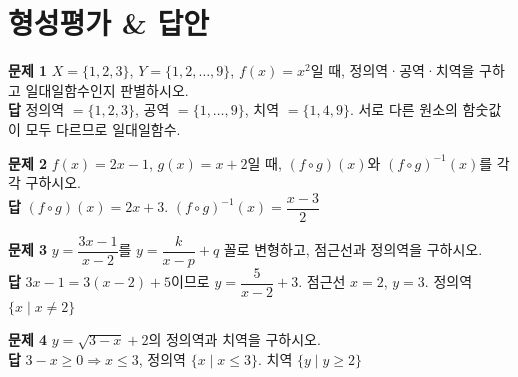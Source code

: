 \documentclass[11pt,a4paper]{article}
\begin{document}
\section{형성평가 \& 답안}
\begin{minipage}[t]{0.48\linewidth}
\begin{answerbox}
\textbf{문제 1} \quad $X=\{1,2,3\}$, $Y=\{1,2,\ldots,9\}$, $f(x)=x^2$일 때, 정의역·공역·치역을 구하고 일대일함수인지 판별하시오.\\[4pt]
\textbf{\color{goldstrong}답} \; 정의역 $=\{1,2,3\}$, 공역 $=\{1,\ldots,9\}$, 치역 $=\{1,4,9\}$. 서로 다른 원소의 함숫값이 모두 다르므로 일대일함수.
\end{answerbox}
\end{minipage}\hfill
\begin{minipage}[t]{0.48\linewidth}
\begin{answerbox}
\textbf{문제 2} \quad $f(x)=2x-1$, $g(x)=x+2$일 때, $(f\circ g)(x)$와 $(f\circ g)^{-1}(x)$를 각각 구하시오.\\[4pt]
\textbf{\color{goldstrong}답} \; $(f\circ g)(x)=2x+3$. \; $(f\circ g)^{-1}(x)=\dfrac{x-3}{2}$
\end{answerbox}
\end{minipage}

\vspace{6pt}
\begin{minipage}[t]{0.48\linewidth}
\begin{answerbox}
\textbf{문제 3} \quad $y=\dfrac{3x-1}{x-2}$를 $y=\dfrac{k}{x-p}+q$ 꼴로 변형하고, 점근선과 정의역을 구하시오.\\[4pt]
\textbf{\color{goldstrong}답} \; $3x-1=3(x-2)+5$이므로 $y=\dfrac{5}{x-2}+3$. 점근선 $x=2$, $y=3$. 정의역 $\{x\mid x\neq2\}$
\end{answerbox}
\end{minipage}\hfill
\begin{minipage}[t]{0.48\linewidth}
\begin{answerbox}
\textbf{문제 4} \quad $y=\sqrt{3-x}+2$의 정의역과 치역을 구하시오.\\[4pt]
\textbf{\color{goldstrong}답} \; $3-x\geq0 \Rightarrow x\leq3$, 정의역 $\{x\mid x\leq3\}$. 치역 $\{y\mid y\geq2\}$
\end{answerbox}
\end{minipage}
\end{document}
